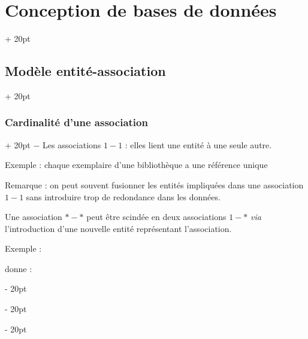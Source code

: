 \documentclass[a4paper, 12pt, twoside]{article}
\newcommand{\ind}[1][20pt]{\advance\leftskip + #1}
\newcommand{\deind}[1][20pt]{\advance\leftskip - #1}
\newenvironment{indt}[2][20pt]{#2 \par \ind[#1]}{\par \deind} %
\begin{document}
\begin{indt}{\section{Conception de bases de données}}
\begin{indt}{\subsection{Modèle entité-association}}
\begin{indt}{\subsubsection{Cardinalité d'une association}}
                $-$ Les associations $1-1$ : elles lient une entité à une seule autre.

                Exemple : chaque exemplaire d'une bibliothèque a une référence unique

                \begin{center}
                \end{center}

                Remarque : on peut souvent fusionner les entités impliquées dans une association $1-1$ sans introduire trop de redondance dans les données.

                Une association $*-*$ peut être scindée en deux associations $1-*$ \textit{via} l'introduction d'une nouvelle entité représentant l'association.

                Exemple :

                \begin{center}
                \end{center}

                donne :


\end{indt}
\end{indt}
\end{indt}
\end{document}
